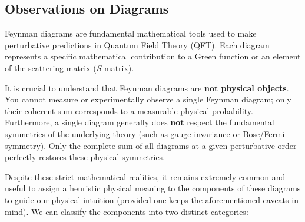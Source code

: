 \subsection{Observations on Diagrams}

Feynman diagrams are fundamental mathematical tools used to make perturbative predictions in Quantum Field Theory (QFT). Each diagram represents a specific mathematical contribution to a Green function or an element of the scattering matrix ($S$-matrix).

It is crucial to understand that Feynman diagrams are \textbf{not physical objects}. You cannot measure or experimentally observe a single Feynman diagram; only their coherent sum corresponds to a measurable physical probability. Furthermore, a single diagram generally does \textbf{not} respect the fundamental symmetries of the underlying theory (such as gauge invariance or Bose/Fermi symmetry). Only the complete sum of all diagrams at a given perturbative order perfectly restores these physical symmetries.

Despite these strict mathematical realities, it remains extremely common and useful to assign a heuristic physical meaning to the components of these diagrams to guide our physical intuition (provided one keeps the aforementioned caveats in mind). We can classify the components into two distinct categories:

